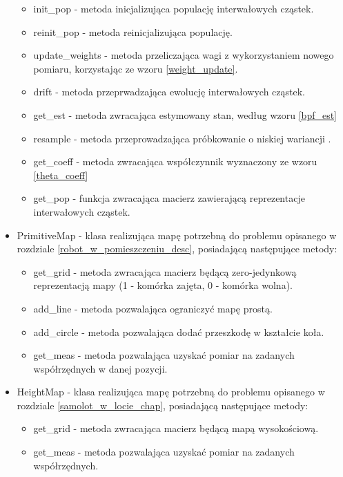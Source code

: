 \begin{itemize}
\begin{itemize}
		\item init\_pop - metoda inicjalizująca populację interwałowych cząstek.
		\item reinit\_pop - metoda reinicjalizująca populację.
		\item update\_weights - metoda przeliczająca wagi z wykorzystaniem nowego pomiaru, korzystając ze wzoru \ref{weight_update}.
		\item drift - metoda przeprwadzająca ewolucję interwałowych cząstek.
		\item get\_est - metoda zwracająca estymowany stan, według wzoru \ref{bpf_est}
		\item resample - metoda przeprowadzająca próbkowanie o niskiej wariancji \cite{sus_wiki}.
		\item get\_coeff - metoda zwracająca współczynnik wyznaczony ze wzoru \ref{theta_coeff}
		\item get\_pop - funkcja zwracająca macierz zawierającą reprezentacje interwałowych cząstek.
	\end{itemize}
	\item PrimitiveMap - klasa realizująca mapę potrzebną do problemu opisanego w rozdziale \ref{robot_w_pomieszczeniu_desc}, posiadającą następujące metody:
	\begin{itemize}
		\item get\_grid - metoda zwracająca macierz będącą zero-jedynkową reprezentacją mapy (1 - komórka zajęta, 0 - komórka wolna).
		\item add\_line - metoda pozwalająca ograniczyć mapę prostą.
		\item add\_circle - metoda pozwalająca dodać przeszkodę w kształcie koła.
		\item get\_meas - metoda pozwalająca uzyskać pomiar na zadanych współrzędnych w danej pozycji.
	\end{itemize}

	\item HeightMap - klasa realizująca mapę potrzebną do problemu opisanego w rozdziale \ref{samolot_w_locie_chap}, posiadającą następujące metody:
	\begin{itemize}
		\item get\_grid - metoda zwracająca macierz będącą mapą wysokościową.
		\item get\_meas - metoda pozwalająca uzyskać pomiar na zadanych współrzędnych.
	\end{itemize}
	
\end{itemize}

